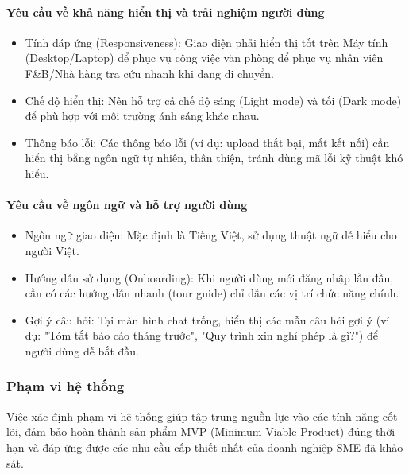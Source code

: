 \paragraph{Yêu cầu về khả năng hiển thị và trải nghiệm người
dùng}\label{yuxeau-cux1ea7u-vux1ec1-khux1ea3-nux103ng-hiux1ec3n-thux1ecb-vuxe0-trux1ea3i-nghiux1ec7m-ngux1b0ux1eddi-duxf9ng}

\begin{itemize}
\item
  Tính đáp ứng (Responsiveness): Giao diện phải hiển thị tốt trên Máy
  tính (Desktop/Laptop) để phục vụ công việc văn phòng để phục vụ nhân
  viên F\&B/Nhà hàng tra cứu nhanh khi đang di chuyển.
\item
  Chế độ hiển thị: Nên hỗ trợ cả chế độ sáng (Light mode) và tối (Dark
  mode) để phù hợp với môi trường ánh sáng khác nhau.
\item
  Thông báo lỗi: Các thông báo lỗi (ví dụ: upload thất bại, mất kết nối)
  cần hiển thị bằng ngôn ngữ tự nhiên, thân thiện, tránh dùng mã lỗi kỹ
  thuật khó hiểu.
\end{itemize}

\paragraph{Yêu cầu về ngôn ngữ và hỗ trợ người
dùng}\label{yuxeau-cux1ea7u-vux1ec1-nguxf4n-ngux1eef-vuxe0-hux1ed7-trux1ee3-ngux1b0ux1eddi-duxf9ng}

\begin{itemize}
\item
  Ngôn ngữ giao diện: Mặc định là Tiếng Việt, sử dụng thuật ngữ dễ hiểu
  cho người Việt.
\item
  Hướng dẫn sử dụng (Onboarding): Khi người dùng mới đăng nhập lần đầu,
  cần có các hướng dẫn nhanh (tour guide) chỉ dẫn các vị trí chức năng
  chính.
\item
  Gợi ý câu hỏi: Tại màn hình chat trống, hiển thị các mẫu câu hỏi gợi ý
  (ví dụ: "Tóm tắt báo cáo tháng trước", "Quy trình xin nghỉ phép là
  gì?") để người dùng dễ bắt đầu.
\end{itemize}

\subsubsection{Phạm vi hệ thống}\label{phux1ea1m-vi-hux1ec7-thux1ed1ng}

Việc xác định phạm vi hệ thống giúp tập trung nguồn lực vào các tính
năng cốt lõi, đảm bảo hoàn thành sản phẩm MVP (Minimum Viable Product)
đúng thời hạn và đáp ứng được các nhu cầu cấp thiết nhất của doanh
nghiệp SME đã khảo sát.

